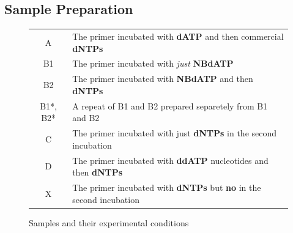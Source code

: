 \documentclass{ssiBio}
\begin{document}
\subsection{Sample Preparation}
\begin{figure}[ht]
\begin{center}
\begin{tabular}{ c | l }
	\hline
	A & The primer incubated with \textbf{dATP} and then commercial \textbf{dNTPs} \\
	B1 & The primer incubated with \textit{just} \textbf{NBdATP} \\
	B2 & The primer incubated with \textbf{NBdATP} and then \textbf{dNTPs}\\
	B1*, B2* & A repeat of B1 and B2 prepared separetely from B1 and B2\\
	C & The primer incubated with just \textbf{dNTPs} in the second incubation \\
	D & The primer incubated with \textbf{ddATP} nucleotides and then \textbf{dNTPs} \\
	X & The primer incubated with \textbf{dNTPs} but \textbf{no \tdt{}} in the second incubation \\
	\hline
\end{tabular}
\end{center}
	\label{sampleTable}
	\caption{Samples and their experimental conditions}
\end{figure}
\end{document}
